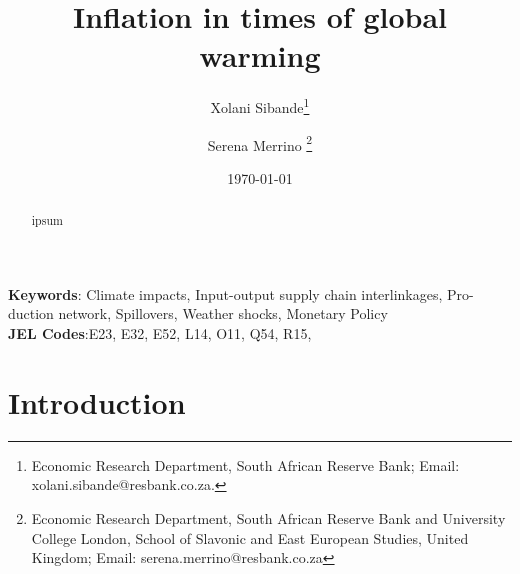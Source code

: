 \documentclass[
  letterpaper,
  DIV=11,
  numbers=noendperiod]{scrartcl}
\author{}
\date{}
\begin{document}
\title{Inflation in times of global warming}


\author {Xolani Sibande\footnote{Economic Research Department, South African Reserve Bank; Email: xolani.sibande@resbank.co.za.} \and
Serena Merrino \footnote{Economic Research Department, South African Reserve Bank and University College London, School of Slavonic and East European Studies, United Kingdom; Email: serena.merrino@resbank.co.za}}


\date{\today}
\maketitle

\begin{abstract}
ipsum

\end{abstract}

\noindent\textbf{Keywords}: Climate impacts, Input-output supply chain interlinkages, Pro-
duction network, Spillovers, Weather shocks, Monetary Policy \\
\textbf{JEL Codes}:E23, E32, E52, L14, O11, Q54, R15,
\newpage

\section{Introduction}\label{introduction}
\end{document}
